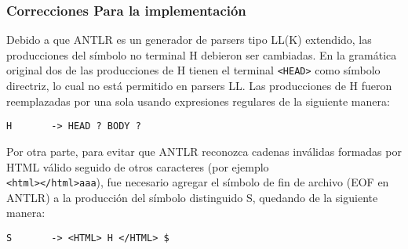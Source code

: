 \subsubsection{Correcciones Para la implementaci\'on}

Debido a que ANTLR es un generador de parsers tipo LL(K) extendido, las producciones del símbolo no terminal H debieron ser cambiadas. En la gramática original dos de las producciones de H tienen el terminal \texttt{<HEAD>} como símbolo directriz, lo cual no está permitido en parsers LL. Las producciones de H fueron reemplazadas por una sola usando expresiones regulares de la siguiente manera:

\begin{lstlisting}
H       -> HEAD ? BODY ?
\end{lstlisting}

Por otra parte, para evitar que ANTLR reconozca cadenas inválidas formadas por HTML válido seguido de otros caracteres (por ejemplo \\ \texttt{<html></html>aaa}), fue necesario agregar el símbolo de fin de archivo (EOF en ANTLR) a la producción del símbolo distinguido S, quedando de la siguiente manera:

\begin{lstlisting}
S       -> <HTML> H </HTML> $
\end{lstlisting}
